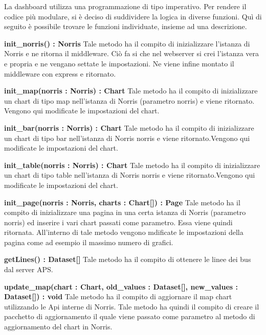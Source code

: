 
        La dashboard utilizza una programmazione di tipo imperativo. Per rendere il codice più modulare, si è deciso di suddividere la logica in diverse funzioni. Quì di seguito è possibile trovare le funzioni individuate, insieme ad una descrizione.

        \begin{description}
            \item \textbf{init\_norris() : Norris} Tale metodo ha il compito di inizializzare l'istanza di Norris e ne ritorna il middleware. Ciò fa si che nel webserver si crei l'istanza vera e propria e ne vengano settate le impostazioni. Ne viene infine montato il middleware con express e ritornato.
            
            \item \textbf{init\_map(norris : Norris) : Chart} Tale metodo ha il compito di inizializzare un chart di tipo map nell'istanza di Norris (parametro norris) e viene ritornato. Vengono qui modificate le impostazioni del chart.
            
            \item \textbf{init\_bar(norris : Norris) : Chart} Tale metodo ha il compito di inizializzare un chart di tipo bar nell'istanza di Norris norris e viene ritornato.Vengono qui modificate le impostazioni del chart.
            
            \item \textbf{init\_table(norris : Norris) : Chart} Tale metodo ha il compito di inizializzare un chart di tipo table nell'istanza di Norris norris e viene ritornato.Vengono qui modificate le impostazioni del chart.
            
            \item \textbf{init\_page(norris : Norris, charts : Chart[]) : Page} Tale metodo ha il compito di inizializzare una pagina in una certa istanza di Norris (parametro norris) ed inserire i vari chart passati come parametro. Essa viene quindi ritornata. All'interno di tale metodo vengono mdificate le impostazioni della pagina come ad esempio il massimo numero di grafici.
            
            \item \textbf{getLines() : Dataset[]} Tale metodo ha il compito di ottenere le linee dei bus dal server APS. 
            
            \item \textbf{update\_map(chart : Chart, old\_values : Dataset[], new\_values : Dataset[]) : void} Tale metodo ha il compito di aggiornare il map chart utilizzando le Api interne di Norris. Tale metodo ha quindi il compito di creare il pacchetto di aggiornamento il quale viene passato come parametro al metodo di aggiornamento del chart in Norris.
            

\end{description}
